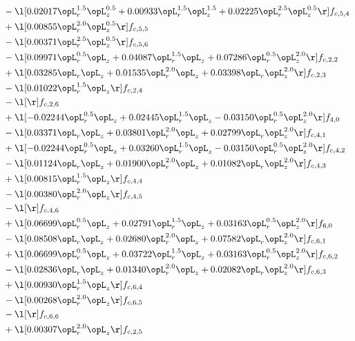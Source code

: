\begin{alignat}{2}
& - \l[  0.02017 \opL_r^{1.5} \opL_z^{0.5} +  0.00933 \opL_r^{1.5} \opL_z^{1.5} +  0.02225 \opL_r^{2.5} \opL_z^{0.5}  \r] f_{c,5,4} \nonumber \\ 
& + \l[  0.00855 \opL_r^{2.0} \opL_z^{0.5}  \r] f_{c,5,5} \nonumber \\ 
& - \l[  0.00371 \opL_r^{2.5} \opL_z^{0.5}  \r] f_{c,5,6} \nonumber \\ 
& - \l[  0.09971 \opL_r^{0.5} \opL_z +  0.04087 \opL_r^{1.5} \opL_z +  0.07286 \opL_r^{0.5} \opL_z^{2.0}  \r] f_{c,2,2} \nonumber \\ 
& + \l[  0.03285 \opL_r \opL_z +  0.01535 \opL_r^{2.0} \opL_z +  0.03398 \opL_r \opL_z^{2.0}  \r] f_{c,2,3} \nonumber \\ 
& - \l[  0.01022 \opL_r^{1.5} \opL_z  \r] f_{c,2,4} \nonumber \\ 
& - \l[  \r] f_{c,2,6} \nonumber \\ 
& + \l[  -0.02244 \opL_r^{0.5} \opL_z +  0.02445 \opL_r^{1.5} \opL_z   -0.03150 \opL_r^{0.5} \opL_z^{2.0}  \r] f_{4,0} \nonumber \\ 
& - \l[  0.03371 \opL_r \opL_z +  0.03801 \opL_r^{2.0} \opL_z +  0.02799 \opL_r \opL_z^{2.0}  \r] f_{c,4,1} \nonumber \\ 
& + \l[  -0.02244 \opL_r^{0.5} \opL_z +  0.03260 \opL_r^{1.5} \opL_z   -0.03150 \opL_r^{0.5} \opL_z^{2.0}  \r] f_{c,4,2} \nonumber \\ 
& - \l[  0.01124 \opL_r \opL_z +  0.01900 \opL_r^{2.0} \opL_z +  0.01082 \opL_r \opL_z^{2.0}  \r] f_{c,4,3} \nonumber \\ 
& + \l[  0.00815 \opL_r^{1.5} \opL_z  \r] f_{c,4,4} \nonumber \\ 
& - \l[  0.00380 \opL_r^{2.0} \opL_z  \r] f_{c,4,5} \nonumber \\ 
& - \l[  \r] f_{c,4,6} \nonumber \\ 
& + \l[  0.06699 \opL_r^{0.5} \opL_z +  0.02791 \opL_r^{1.5} \opL_z +  0.03163 \opL_r^{0.5} \opL_z^{2.0}  \r] f_{6,0} \nonumber \\ 
& - \l[  0.08508 \opL_r \opL_z +  0.02680 \opL_r^{2.0} \opL_z +  0.07582 \opL_r \opL_z^{2.0}  \r] f_{c,6,1} \nonumber \\ 
& + \l[  0.06699 \opL_r^{0.5} \opL_z +  0.03722 \opL_r^{1.5} \opL_z +  0.03163 \opL_r^{0.5} \opL_z^{2.0}  \r] f_{c,6,2} \nonumber \\ 
& - \l[  0.02836 \opL_r \opL_z +  0.01340 \opL_r^{2.0} \opL_z +  0.02082 \opL_r \opL_z^{2.0}  \r] f_{c,6,3} \nonumber \\ 
& + \l[  0.00930 \opL_r^{1.5} \opL_z  \r] f_{c,6,4} \nonumber \\ 
& - \l[  0.00268 \opL_r^{2.0} \opL_z  \r] f_{c,6,5} \nonumber \\ 
& - \l[  \r] f_{c,6,6} \nonumber \\ 
& + \l[  0.00307 \opL_r^{2.0} \opL_z  \r] f_{c,2,5} \nonumber \\ 
\end{alignat} 



